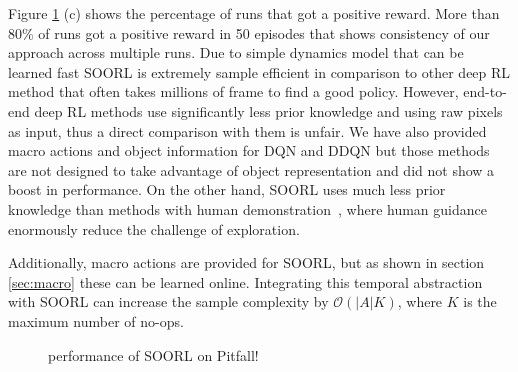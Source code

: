Figure \ref{fig:pitfall} (c) shows the percentage of runs that got a positive reward. More than $80\%$ of runs got a positive reward in 50 episodes that shows consistency of our approach across multiple runs. Due to simple dynamics model that can be learned fast SOORL is extremely sample efficient in comparison to other deep RL method that often takes millions of frame to find a good policy. However, end-to-end deep RL methods use significantly less prior knowledge and using raw pixels as input, thus a direct comparison with them is unfair. We have also provided macro actions and object information for DQN and DDQN but those methods are not designed to take advantage of object representation and did not show a boost in performance. On the other hand, SOORL uses much less prior knowledge than methods with human demonstration~\citep{aytar2018playing, hester2017deep}, where human guidance enormously reduce the challenge of exploration.

Additionally, macro actions are provided for SOORL, but as shown in section \ref{sec:macro} these can be learned online. Integrating this temporal abstraction with SOORL can increase the sample complexity by $\mathcal{O}(|A|K)$, where $K$ is the maximum number of no-ops.


\begin{figure}[tb]
    \centering
    \caption{performance of SOORL on Pitfall!}%
    \label{fig:pitfall}%
\end{figure}





